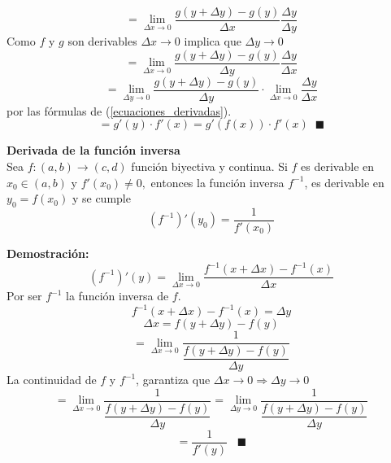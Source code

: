 \documentclass[10pt,twoside]{SelfArx} %
\begin{document}
\begin{equation}
=\lim\limits_{\Delta x\rightarrow0}\dfrac{g (y+\Delta y)-g(y)}{\Delta x}\dfrac{\Delta y}{\Delta y}
\end{equation}
Como $ f $ y $ g $ son derivables $ \Delta x\rightarrow0 $ implica que $ \Delta y\rightarrow0 $
\begin{equation}
=\lim\limits_{\Delta x\rightarrow0}\dfrac{g (y+\Delta y)-g(y)}{\Delta y}\dfrac{\Delta y}{\Delta x}
\end{equation}
\begin{equation}
=\lim\limits_{\Delta y\rightarrow0}\dfrac{g (y+\Delta y)-g(y)}{\Delta y}\cdot\lim\limits_{\Delta x\rightarrow0}\dfrac{\Delta y}{\Delta x}
\end{equation}
por las f\'ormulas de (\ref{ecuaciones_derivadas}).
\begin{equation}
=g'(y)\cdot f'(x)=g'(f(x))\cdot f'(x)\;\;\blacksquare
\end{equation}
\begin{teorema}
	\textbf{Derivada de la funci\'on inversa}\\
	Sea $ f:(a,b)\rightarrow(c,d) $ funci\'on biyectiva y continua. Si $ f $ es derivable en $ x_{0}\in(a,b) $ y $ f'(x_{0})\neq0,  $
	entonces la funci\'on inversa $ f^{-1} $, es derivable en $ y_{0}=f(x_{0}) $ y se cumple
	\begin{equation}
	(f^{-1})'(y_{0})=\dfrac{1}{f'(x_{0})}
	\end{equation}
\end{teorema}
\textbf{Demostración:}\\
\begin{equation}
(f^{-1})'(y)=\lim\limits_{\Delta x\rightarrow0}\dfrac{f^{-1}(x+\Delta x)-f^{-1}(x)}{\Delta x}
\end{equation}
Por ser $ f^{-1} $ la funci\'on inversa de $ f $.
\[ f^{-1}(x+\Delta x)-f^{-1}(x)=\Delta y \]
\[ \Delta x= f(y+\Delta y)-f(y)\]
\begin{equation}
=\lim\limits_{\Delta x\rightarrow0}\dfrac{1}{\dfrac{f(y+\Delta y)-f(y)}{\Delta y}}
\end{equation}
La continuidad de $ f $ y $ f^{-1} $, garantiza que $ \Delta x\rightarrow0\Rightarrow\Delta y\rightarrow0 $
\begin{equation}
=\lim\limits_{\Delta x\rightarrow0}\dfrac{1}{\dfrac{f(y+\Delta y)-f(y)}{\Delta y}}
=\lim\limits_{\Delta y\rightarrow0}\dfrac{1}{\dfrac{f(y+\Delta y)-f(y)}{\Delta y}}
\end{equation}
\begin{equation}
=\dfrac{1}{f'(y)}\;\;\;\blacksquare
\end{equation}
\end{document}
